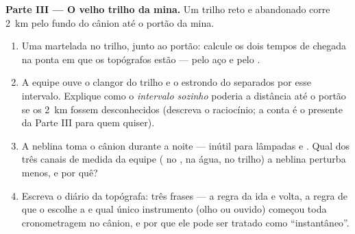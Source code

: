 \begin{problem}
\medskip\noindent\textbf{Parte III --- O velho trilho da mina.}
Um trilho reto e abandonado corre \qty{2}{km} pelo fundo do cânion
até o portão da mina.
\begin{enumerate}[resume]
  \item Uma martelada no trilho, junto ao portão: calcule os dois
        tempos de chegada na ponta em que os topógrafos estão ---
        pelo aço e pelo .
  \item A equipe ouve o clangor do trilho e o estrondo do 
        separados por esse intervalo. Explique como o \emph{intervalo
        sozinho} poderia  a distância até o portão se os
        \qty{2}{km} fossem desconhecidos (descreva o raciocínio; a
        conta é o presente da Parte III para quem quiser).
  \item A neblina toma o cânion durante a noite --- inútil para
        lâmpadas e . Qual dos três canais de medida da equipe
        ( no ,  na água,  no trilho) a neblina perturba
        menos, e por quê?
  \item Escreva o diário da topógrafa: três frases --- a regra da ida
        e volta, a regra de que o  escolhe a  e qual
        único instrumento (olho ou ouvido) começou toda cronometragem
        no cânion, e por que ele pode ser tratado como
        ``instantâneo''.
\end{enumerate}
\end{problem}
